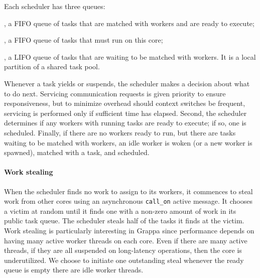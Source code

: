 Each scheduler has three queues:

, a FIFO queue of tasks that are
  matched with workers and are ready to execute;

, a FIFO queue of tasks that must run on this core;

,  a LIFO queue of tasks that are
  waiting to be matched with workers. It is a local partition of a shared
  task pool.

Whenever a task yields or suspends, the scheduler makes a decision
about what to do next. Servicing communication requests is given priority
to ensure responsiveness, but to minimize overhead should context switches be frequent, servicing is performed only if sufficient time has elapsed.
Second, the scheduler determines if any workers with running tasks are
ready to execute; if so, one is scheduled. Finally, if there are no
workers ready to run, but there are tasks waiting to be matched with
workers, an idle worker is woken (or a new worker is spawned), matched
with a task, and scheduled.

\paragraph{Work stealing} 
When the scheduler finds no work to assign to its workers, it
commences to steal work from other cores using an asynchronous
\texttt{call\_on} active message.  It chooses a victim at random until it
finds one with a non-zero amount of work in its public task queue.  The scheduler steals half of the tasks it finds at the victim.
Work stealing is particularly interesting in Grappa since performance depends
on having many active worker threads on each core. Even if there are many
active threads, if they are all suspended on long-latency operations,
then the core is underutilized. We choose to initiate one outstanding
steal whenever the ready queue is empty there are idle worker threads.



